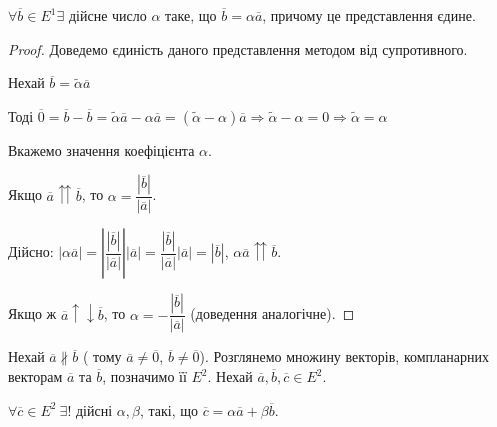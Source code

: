 \begin{theorem} \label{vectorSingleRepresentation}
	$\forall \overline{b} \in E^1 \exists$ дійсне число $\alpha$ таке, що $\overline{b} = \alpha\overline{a}$, причому це представлення єдине. 
\end{theorem}
\begin{proof}
	Доведемо єдиність даного представлення методом від супротивного.
	
	Нехай $\overline{b} = \tilde{\alpha}\overline{a}$
	
	Тоді $\overline{0} = \overline{b} - \overline{b} = \tilde{\alpha}\overline{a} - \alpha\overline{a} = (\tilde{\alpha} - \alpha)\overline{a} \Rightarrow \tilde{\alpha} - \alpha = 0 \Rightarrow \tilde{\alpha} = \alpha$ 

	Вкажемо значення коефіцієнта $\alpha$.
	
	Якщо $\overline{a} \upuparrows \overline{b}$, то $\alpha = \dfrac{|\overline{b}|}{|\overline{a}|}$.
	
	Дійсно: $|\alpha\overline{a}| = \left|\dfrac{|\overline{b}|}{|\overline{a}|}\right||\overline{a}| = \dfrac{|\overline{b}|}{|\overline{a}|}|\overline{a}| = |\overline{b}|$, $\alpha\overline{a} \upuparrows \overline{b}$.

	Якщо ж $\overline{a} \uparrow \downarrow \overline{b}$, то $\alpha = -\dfrac{|\overline{b}|}{|\overline{a}|}$ (доведення аналогічне).
\end{proof}

Нехай $\overline{a} \nparallel \overline{b}$ ( тому $\overline{a} \neq \overline{0}$, $\overline{b} \neq \overline{0}$). Розглянемо множину векторів, компланарних векторам $\overline{a}$ та $\overline{b}$, позначимо її $E^2$.
Нехай $\overline{a}, \overline{b}, \overline{c} \in E^2$.

\begin{theorem}
	$\forall \overline{c} \in E^2 ~ \exists!$  дійсні $\alpha, \beta$, такі, що $\overline{c} = \alpha\overline{a} + \beta\overline{b}$.
\end{theorem} 

